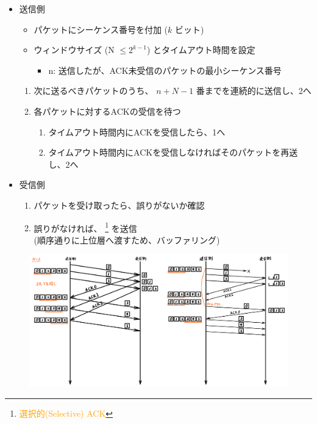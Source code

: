\begin{itemize}
  \item 送信側
  \begin{itemize}
    \item パケットにシーケンス番号を付加 ($k$ ビット)
    \item ウィンドウサイズ (N $\leq 2^{k-1}$) とタイムアウト時間を設定
    \begin{itemize}
      \item n: 送信したが、ACK未受信のパケットの最小シーケンス番号
    \end{itemize}
  \end{itemize}
  \begin{enumerate}
    \item 次に送るべきパケットのうち、 $n+N-1$ 番までを連続的に送信し、2へ
    \item 各パケットに対するACKの受信を待つ
    \begin{enumerate}
      \item タイムアウト時間内にACKを受信したら、1へ
      \item タイムアウト時間内にACKを受信しなければそのパケットを再送し、2へ
    \end{enumerate}
  \end{enumerate}
  \item 受信側
  \begin{enumerate}
    \item パケットを受け取ったら、誤りがないか確認
    \item 誤りがなければ、
    \footnote{\textcolor{orange}{選択的(Selective) ACK}}
    を送信\\
      (順序通りに上位層へ渡すため、バッファリング)
  \end{enumerate}
\end{itemize}

\begin{figure}[h]
  \centering
  \includegraphics[width=0.8\linewidth]{image/selective_repeat.png}
\end{figure}


